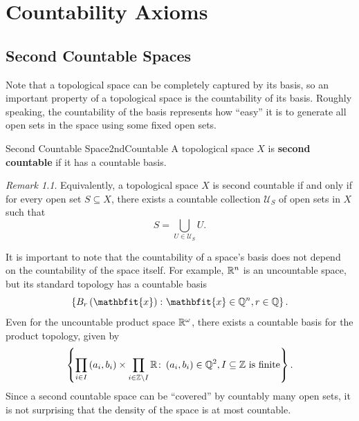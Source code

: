\documentclass[math]{amznotes}
\theoremstyle{remark}
\newtheorem*{remark}{Remark}
\begin{document}
\chapter{Countability Axioms}
\section{Second Countable Spaces}
Note that a topological space can be completely captured by its basis, so an important property of a topological space is the countability of its basis. Roughly speaking, the countability of the basis represents how ``easy'' it is to generate all open sets in the space using some fixed open sets.
\begin{dfnbox}{Second Countable Space}{2ndCountable}
    A topological space $X$ is {\color{red} \textbf{second countable}} if it has a countable basis.
\end{dfnbox}
\begin{notebox}
    \begin{remark}
        Equivalently, a topological space $X$ is second countable if and only if for every open set $S \subseteq X$, there exists a countable collection $\mathcal{U}_S$ of open sets in $X$ such that 
        \begin{equation*}
            S = \bigcup_{U \in \mathcal{U}_S}U.
        \end{equation*}
    \end{remark}
\end{notebox}
It is important to note that the countability of a space's basis does not depend on the countability of the space itself. For example, $\mathbb{R}^n$ is an uncountable space, but its standard topology has a countable basis 
\begin{equation*}
    \left\{B_r\left(\mathbfit{x}\right) \colon \mathbfit{x} \in \Q^n, r \in \Q\right\}.
\end{equation*}
Even for the uncountable product space $\mathbb{R}^{\omega}$, there exists a countable basis for the product topology, given by 
\begin{equation*}
    \left\{\prod_{i \in I}\left(a_i, b_i\right) \times \prod_{i \in \mathbb{Z} \setminus I}\mathbb{R} \colon \left(a_i, b_i\right) \in \mathbb{Q}^2, I \subseteq \mathbb{Z} \textrm{ is finite}\right\}.
\end{equation*}
Since a second countable space can be ``covered'' by countably many open sets, it is not surprising that the density of the space is at most countable.
\end{document}
